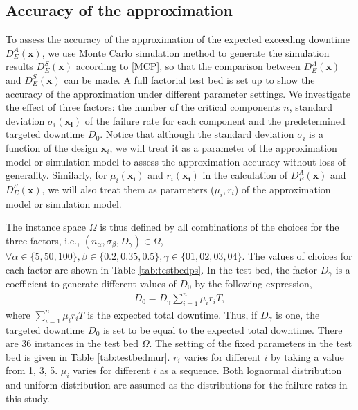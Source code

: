 \documentclass[preprint,12pt]{elsarticle}
\begin{document}
\subsection{Accuracy of the approximation}
To assess the accuracy of the approximation of the expected exceeding downtime $D_{E}^{A}(\boldsymbol{x})$, we use Monte Carlo simulation method to generate the simulation results $D_{E}^{S}(\boldsymbol{x})$ according to \ref{MCP}, so that the comparison between $D_{E}^{A}(\boldsymbol{x})$ and $D_{E}^{S}(\boldsymbol{x})$ can be made. A full factorial test bed is set up to show the accuracy of the approximation under different parameter settings. We investigate the effect of three factors: the number of the critical components $n$, standard deviation $\sigma_{i}(\boldsymbol{x_i})$ of the failure rate for each component and the predetermined targeted downtime $D_{0}$. Notice that although the standard deviation $\sigma_i$ is a function of the design $\boldsymbol{x}_i$, we will treat it as a parameter of the approximation model or simulation model to assess the approximation accuracy without loss of generality. Similarly, for $\mu_i(\boldsymbol{x_i})$ and $r_i(\boldsymbol{x_i})$ in the calculation of $D_{E}^{A}(\boldsymbol{x})$ and $D_{E}^{S}(\boldsymbol{x})$, we will also treat them as parameters ($\mu_i , r_i$) of the approximation model or simulation model.

The instance space $\Omega$ is thus defined by all combinations of the choices for the three factors, i.e., $(n_{\alpha},\sigma_{\beta},D_{\gamma}) \in \Omega$, $\forall \alpha \in \{5,50,100\}, \beta \in \{0.2,0.35,0.5\}, \gamma \in \{01,02,03,04\}$. The values of choices for each factor are shown in Table \ref{tab:testbedps}. In the test bed, the factor $D_{\gamma}$ is a coefficient to generate different values of $D_0$ by the following expression,
 \begin{eqnarray}
 D_{0} = D_{\gamma}\sum_{i=1}^{n}{\mu_{i} r_{i} T}, \label{D0}
\end{eqnarray}
where $\sum_{i=1}^{n}{\mu_{i} r_{i} T}$ is the expected total downtime. Thus, if $D_{\gamma}$ is one, the targeted downtime $D_0$ is set to be equal to the expected total downtime.
There are 36 instances in the test bed $\Omega$. The setting of the fixed parameters in the test bed is given in Table \ref{tab:testbedmur}. $r_{i}$ varies for different $i$ by taking a value from {1, 3, 5}. $\mu_{i}$ varies for different $i$ as a sequence. Both lognormal distribution and uniform distribution are assumed as the distributions for the failure rates in this study.
\end{document}
